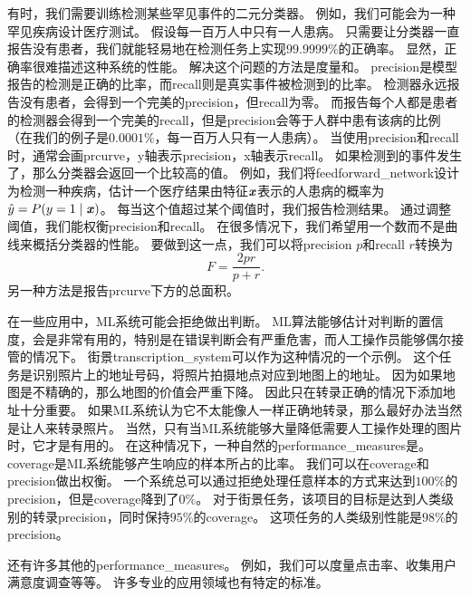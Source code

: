 有时，我们需要训练检测某些罕见事件的二元分类器。
例如，我们可能会为一种罕见疾病设计医疗测试。
假设每一百万人中只有一人患病。
只需要让分类器一直报告没有患者，我们就能轻易地在检测任务上实现$99.9999\%$的正确率。
显然，正确率很难描述这种系统的性能。
解决这个问题的方法是度量和。
\gls{precision}是模型报告的检测是正确的比率，而\gls{recall}则是真实事件被检测到的比率。
检测器永远报告没有患者，会得到一个完美的\gls{precision}，但\gls{recall}为零。
而报告每个人都是患者的检测器会得到一个完美的\gls{recall}，但是\gls{precision}会等于人群中患有该病的比例（在我们的例子是$0.0001\%$，每一百万人只有一人患病）。
当使用\gls{precision}和\gls{recall}时，通常会画\gls{prcurve}，y轴表示\gls{precision}，x轴表示\gls{recall}。
如果检测到的事件发生了，那么分类器会返回一个比较高的值。
例如，我们将\gls{feedforward_network}设计为检测一种疾病，估计一个医疗结果由特征$\boldsymbol{\mathit{x}}$表示的人患病的概率为$\hat{y} = P(y=1\mid\boldsymbol{\mathit{x}})$。
每当这个值超过某个阈值时，我们报告检测结果。
通过调整阈值，我们能权衡\gls{precision}和\gls{recall}。
在很多情况下，我们希望用一个数而不是曲线来概括分类器的性能。
要做到这一点，我们可以将\gls{precision} $p$和\gls{recall} $r$转换为
\begin{equation}
	F = \frac{2pr}{p+r}.
\end{equation}
另一种方法是报告\gls{prcurve}下方的总面积。


在一些应用中，\gls{ML}系统可能会拒绝做出判断。
\gls{ML}算法能够估计对判断的置信度，会是非常有用的，特别是在错误判断会有严重危害，而人工操作员能够偶尔接管的情况下。
街景\gls{transcription_system}可以作为这种情况的一个示例。
这个任务是识别照片上的地址号码，将照片拍摄地点对应到地图上的地址。%
因为如果地图是不精确的，那么地图的价值会严重下降。
因此只在转录正确的情况下添加地址十分重要。
如果\gls{ML}系统认为它不太能像人一样正确地转录，那么最好办法当然是让人来转录照片。
当然，只有当\gls{ML}系统能够大量降低需要人工操作处理的图片时，它才是有用的。
在这种情况下，一种自然的\gls{performance_measures}是。
\gls{coverage}是\gls{ML}系统能够产生响应的样本所占的比率。
我们可以在\gls{coverage}和\gls{precision}做出权衡。
一个系统总可以通过拒绝处理任意样本的方式来达到$100\%$的\gls{precision}，但是\gls{coverage}降到了$0\%$。
对于街景任务，该项目的目标是达到人类级别的转录\gls{precision}，同时保持$95\%$的\gls{coverage}。
这项任务的人类级别性能是$98\%$的\gls{precision}。

还有许多其他的\gls{performance_measures}。
例如，我们可以度量点击率、收集用户满意度调查等等。
许多专业的应用领域也有特定的标准。

